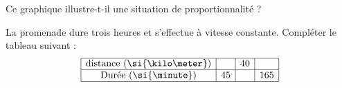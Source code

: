 
\begin{exercice}\label{exosmath-0948}

Ce graphique illustre-t-il une situation de proportionnalité ?

\begin{center}
   
\end{center}

La promenade dure trois heures et s'effectue à vitesse constante. Compléter le tableau suivant :
\begin{equation*}
    \begin{array}[]{|c|c|c|c|}
        \hline
        \text{distance (\si{\kilo\meter})}&&40&\\
          \hline
          \text{Durée (\si{\minute})}&45&&165\\
          \hline
    \end{array}
\end{equation*}

\end{exercice}
